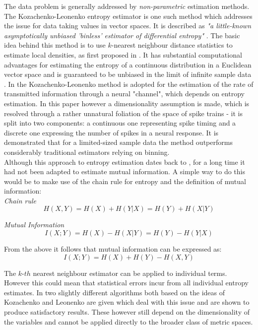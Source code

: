 \documentclass[12pt]{extarticle}
\begin{document}
\noindent
The data problem is generally addressed by \textit{non-parametric}
estimation methods.  The Kozachenko-Leonenko entropy estimator
\cite{Kozachenko-Leonenko} is one such method which addresses the issue for data taking
values in vector spaces. It is described as \textit{"a little-known
  asymptotically unbiased 'binless' estimator of differential
  entropy"} \cite{Victor.2002}. The basic idea behind this method is to use
$k$-nearest neighbour distance statistics to estimate local densities,
as first proposed in \cite{Dobrushin}. It has substantial computational
advantages for estimating the entropy of a continuous distribution in
a Euclidean vector space and is guaranteed to be unbiased in the limit
of infinite sample data \cite{Kozachenko-Leonenko}. In \cite{Victor.2002} the
Kozachenko-Leonenko method is adopted for the estimation of the rate
of transmitted information through a neural "channel", which depends
on entropy estimation. In this paper however a dimensionality
assumption is made, which is resolved through a rather unnatural
foliation of the space of spike trains - it is split into two
components: a continuous one representing spike timing and a discrete
one expressing the number of spikes in a neural response. It is
demonstrated that for a limited-sized sample data the method
outperforms considerably traditional estimators relying on binning.\\

\noindent
Although this approach to entropy estimation dates back to
\cite{Dobrushin}, for a long time it had not been adapted to estimate
mutual information. A simple way to do this would be to make use of
the chain rule for entropy and the definition of mutual information:\\

\textit{Chain rule}
\begin{equation}
H(X,Y) = H(X) + H(Y|X) = H(Y) + H(X|Y)
\end{equation}

\textit{Mutual Information}
\begin{equation}
I(X;Y) = H(X) - H(X|Y) = H(Y) - H(Y|X)
\label{MI(X;Y)=H(X)-H(X|Y)}
\end{equation}

\noindent
From the above it follows that mutual information can be expressed as:
\begin{equation}
I(X;Y) = H(X) + H(Y) - H(X,Y)
\end{equation}

\noindent
The $k$-$th$ nearest neighbour estimator can be applied to individual
terms. However this could mean that statistical errors incur from all
individual entropy estimates. In \cite{Kraskov} two slightly different
algorithms both based on the ideas of Kozachenko and Leonenko are
given which deal with this issue and are shown to produce satisfactory
results. These however still depend on the dimensionality of the
variables and cannot be applied directly to the broader class of
metric spaces.\\
\end{document}

